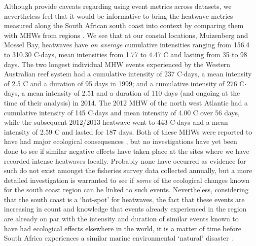 \documentclass[a4paper,10pt,review]{elsarticle}
\begin{document}
Although \citet{Hobday2016} provide caveats regarding using event metrics across datasets, we nevertheless feel that it would be informative to bring the heatwave metrics measured along the South African south coast into context by comparing them with MHWs from regions \citep[see][]{Hobday2016}. We see that at our coastal locations, Muizenberg and Mossel Bay, heatwaves have \emph{on average} cumulative intensities ranging from 156.4 to 310.30 \degree C$\cdot$days, mean intensities from 1.77 to 4.47 \degree C and lasting from 35 to 98 days. The two longest individual MHW events experienced by the Western Australian reef system \citep{Feng2013} had a cumulative intensity of 237 \degree C$\cdot$days, a mean intensity of 2.5 \degree C and a duration of 95 days in 1999; and a cumulative intensity of 276 \degree C$\cdot$days, a mean intensity of 2.51 and a duration of 110 days (and ongoing at the time of their analysis) in 2014. The 2012 MHW of the north west Atlantic \citep{Mills2012, Chen2014} had a cumulative intensity of 145 \degree C$\cdot$days and mean intensity of 4.00 \degree C over 56 days, while the subsequent 2012/2013 heatwave went to 443 \degree C$\cdot$days and a mean intensity of 2.59 \degree C and lasted for 187 days. Both of these MHWs were reported to have had major ecological consequences \citep{Feng2013, Mills2012, Chen2014}, but no investigations have yet been done to see if similar negative effects have taken place at the sites where we have recorded intense heatwaves locally. Probably none have occurred as evidence for such do not exist amongst the fisheries survey data collected annually, but a more detailed investigation is warranted to see if \emph{some} of the ecological changes known for the south coast region \citep{Bolton2012} can be linked to such events. Nevertheless, considering that the south coast is a `hot-spot' for heatwaves, the fact that these events are increasing in count and knowledge that events already experienced in the region are already on par with the intensity and duration of similar events known to have had ecological effects elsewhere in the world, it is a matter of time before South Africa experiences a similar marine environmental `natural' disaster .
\end{document}
